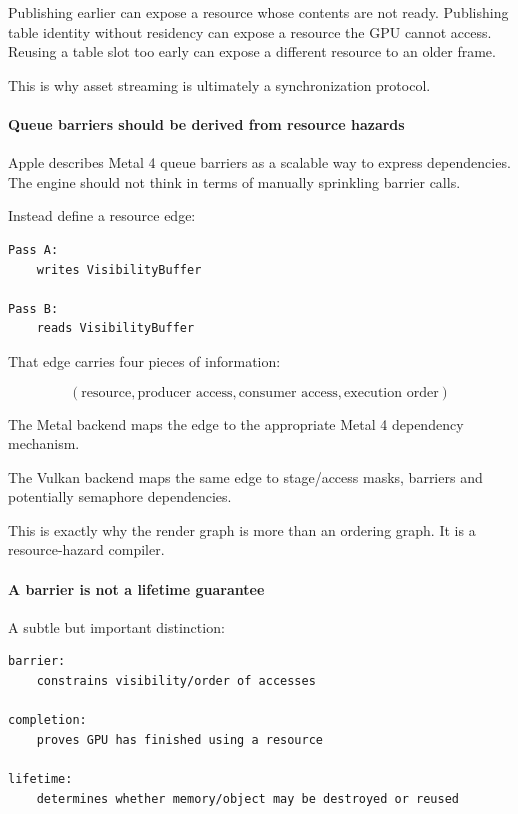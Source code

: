 Publishing earlier can expose a resource whose contents are not ready. Publishing table identity without residency can expose a resource the GPU cannot access. Reusing a table slot too early can expose a different resource to an older frame.

This is why asset streaming is ultimately a synchronization protocol.

\paragraph{Queue barriers should be derived from resource hazards}\label{queue-barriers-should-be-derived-from-resource-hazards}

Apple describes Metal 4 queue barriers as a scalable way to express dependencies. The engine should not think in terms of manually sprinkling barrier calls.

Instead define a resource edge:

\begin{verbatim}
Pass A:
    writes VisibilityBuffer

Pass B:
    reads VisibilityBuffer
\end{verbatim}

That edge carries four pieces of information:

\[
(\text{resource},\text{producer access},\text{consumer access},\text{execution order})
\]

The Metal backend maps the edge to the appropriate Metal 4 dependency mechanism.

The Vulkan backend maps the same edge to stage/access masks, barriers and potentially semaphore dependencies.

This is exactly why the render graph is more than an ordering graph. It is a resource-hazard compiler.

\paragraph{A barrier is not a lifetime guarantee}\label{a-barrier-is-not-a-lifetime-guarantee}

A subtle but important distinction:

\begin{verbatim}
barrier:
    constrains visibility/order of accesses

completion:
    proves GPU has finished using a resource

lifetime:
    determines whether memory/object may be destroyed or reused
\end{verbatim}

